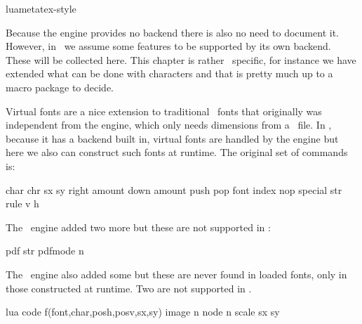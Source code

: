 
\environment luametatex-style

\startdocument[title=Assumptions]

\startsection[title={Introduction}]

Because the engine provides no backend there is also no need to document it.
However, in \CONTEXT\ we assume some features to be supported by its own backend.
These will be collected here. This chapter is rather \CONTEXT\ specific, for
instance we have extended what can be done with characters and that is pretty
much up to a macro package to decide.

\stopsection

\startsection[title=Virtual fonts]

Virtual fonts are a nice extension to traditional \TEX\ fonts that originally was
independent from the engine, which only needs dimensions from a \TFM\ file. In
\LUATEX, because it has a backend built in, virtual fonts are handled by the
engine but here we also can construct such fonts at runtime. The original set of
commands is:

\starttabulate[|w(4em)||||]
\NC char    \NC \textplus  \NC chr sx sy \NC \NC \NR
\NC right   \NC \textplus  \NC amount    \NC \NC \NR
\NC down    \NC \textplus  \NC amount    \NC \NC \NR
\NC push    \NC \textplus  \NC           \NC \NC \NR
\NC pop     \NC \textplus  \NC           \NC \NC \NR
\NC font    \NC \textplus  \NC index     \NC \NC \NR
\NC nop     \NC \textplus  \NC           \NC \NC \NR
\NC special \NC \textminus \NC str       \NC \NC \NR
\NC rule    \NC \textplus  \NC v h       \NC \NC \NR
\stoptabulate

The \PDFTEX\ engine added two more but these are not supported in \CONTEXT:

\starttabulate[|w(4em)||||]
\NC pdf     \NC \textminus \NC str \NC \NC \NR
\NC pdfmode \NC \textminus \NC n   \NC \NC \NR
\stoptabulate

The \LUATEX\ engine also added some but these are never found in loaded fonts,
only in those constructed at runtime. Two are not supported in \CONTEXT.

\starttabulate[|w(4em)||||]
\NC lua     \NC \textplus  \NC code  \NC f(font,char,posh,posv,sx,sy) \NC \NR
\NC image   \NC \textminus \NC n     \NC                              \NC \NR
\NC node    \NC \textplus  \NC n     \NC                              \NC \NR
\NC scale   \NC \textminus \NC sx sy \NC                              \NC \NR
\stoptabulate

